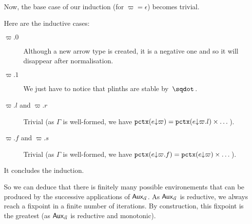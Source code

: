 \documentclass[a4paper]{article}
\theoremstyle{definition}
\begin{document}
    Now, the base case of our induction (for $\varpi=\epsilon$) becomes trivial.

    Here are the inductive cases:
    \begin{description}
      \item[$\varpi.0$] Although a new arrow type is created, it is a negative one and so it will disappear after normalisation.
      \item[$\varpi.1$] We just have to notice that plinths are stable by $\worra {} {}$.
      \item[$\varpi.l$ and $\varpi.r$] Trivial (as $\Gamma$ is well-formed, we have $\texttt{pctx}(e{\downarrow}\varpi) = \texttt{pctx}(e{\downarrow}\varpi.l)\times \dots$).
      \item[$\varpi.f$ and $\varpi.s$] Trivial (as $\Gamma$ is well-formed, we have $\texttt{pctx}(e{\downarrow}\varpi.f) = \texttt{pctx}(e{\downarrow}\varpi)\times \dots$).
    \end{description}

    It concludes the induction.

    So we can deduce that there is finitely many possible environements that can be produced by the successive applications of $\textsf{Aux}_{\vec \alpha}$.
    As $\textsf{Aux}_{\vec \alpha}$ is reductive, we always reach a fixpoint in a finite number of iterations.
    By construction, this fixpoint is the greatest (as $\textsf{Aux}_{\vec \alpha}$ is reductive and monotonic).
\end{document}
